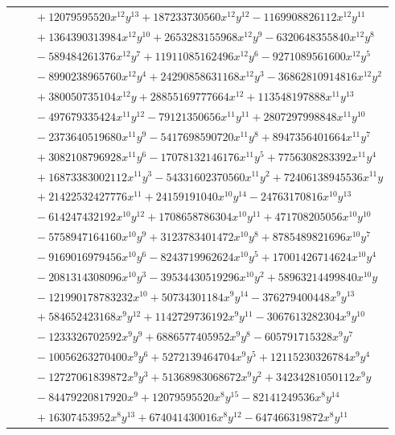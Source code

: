 \documentclass[11pt]{article}
\begin{document}
\begin{longtable}{@{}ll@{}}
 & $\quad +12079595520x^{12}y^{13}+187233730560x^{12}y^{12}-1169908826112x^{12}y^{11}$\\
 & $\quad +1364390313984x^{12}y^{10}+2653283155968x^{12}y^{9}-6320648355840x^{12}y^{8}$\\
 & $\quad -589484261376x^{12}y^{7}+11911085162496x^{12}y^{6}-9271089561600x^{12}y^{5}$\\
 & $\quad -8990238965760x^{12}y^{4}+24290858631168x^{12}y^{3}-36862810914816x^{12}y^{2}$\\
 & $\quad +380050735104x^{12}y+28855169777664x^{12}+113548197888x^{11}y^{13}$\\
 & $\quad -497679335424x^{11}y^{12}-79121350656x^{11}y^{11}+2807297998848x^{11}y^{10}$\\
 & $\quad -2373640519680x^{11}y^{9}-5417698590720x^{11}y^{8}+8947356401664x^{11}y^{7}$\\
 & $\quad +3082108796928x^{11}y^{6}-17078132146176x^{11}y^{5}+7756308283392x^{11}y^{4}$\\
 & $\quad +16873383002112x^{11}y^{3}-54331602370560x^{11}y^{2}+72406138945536x^{11}y$\\
 & $\quad +21422532427776x^{11}+24159191040x^{10}y^{14}-24763170816x^{10}y^{13}$\\
 & $\quad -614247432192x^{10}y^{12}+1708658786304x^{10}y^{11}+471708205056x^{10}y^{10}$\\
 & $\quad -5758947164160x^{10}y^{9}+3123783401472x^{10}y^{8}+8785489821696x^{10}y^{7}$\\
 & $\quad -9169016979456x^{10}y^{6}-8243719962624x^{10}y^{5}+17001426714624x^{10}y^{4}$\\
 & $\quad -2081314308096x^{10}y^{3}-39534430519296x^{10}y^{2}+58963214499840x^{10}y$\\
 & $\quad -121990178783232x^{10}+50734301184x^{9}y^{14}-376279400448x^{9}y^{13}$\\
 & $\quad +584652423168x^{9}y^{12}+1142729736192x^{9}y^{11}-3067613282304x^{9}y^{10}$\\
 & $\quad -1233326702592x^{9}y^{9}+6886577405952x^{9}y^{8}-605791715328x^{9}y^{7}$\\
 & $\quad -10056263270400x^{9}y^{6}+5272139464704x^{9}y^{5}+12115230326784x^{9}y^{4}$\\
 & $\quad -12727061839872x^{9}y^{3}+51368983068672x^{9}y^{2}+34234281050112x^{9}y$\\
 & $\quad -84479220817920x^{9}+12079595520x^{8}y^{15}-82141249536x^{8}y^{14}$\\
 & $\quad +16307453952x^{8}y^{13}+674041430016x^{8}y^{12}-647466319872x^{8}y^{11}$\\

\end{longtable}
\end{document}
